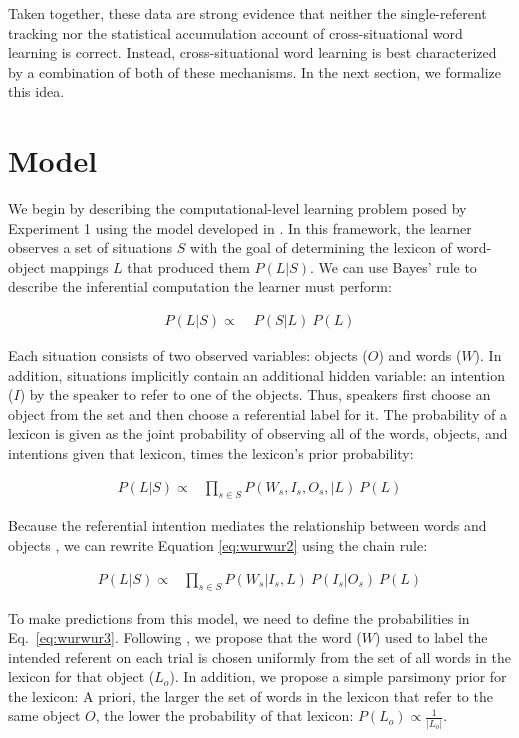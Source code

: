 \documentclass[man,floatsintext]{apa6}
\begin{document}
Taken together, these data are strong evidence that neither the single-referent tracking nor the statistical accumulation account of cross-situational word learning is correct. Instead, cross-situational word learning is best characterized by a combination of both of these mechanisms. In the next section, we formalize this idea.

\section{Model}

We begin by describing the computational-level learning problem posed by Experiment 1 using the model developed in \cite{Frank2009a}. In this framework, the learner observes a set of situations $S$ with the goal of determining the lexicon of word-object mappings $L$ that produced them $P(L|S)$. We can use Bayes' rule to describe the inferential computation the learner must perform: 

\begin{align} 
P(L|S) \propto & \;P(S|L) \: P(L) \label{eq:wurwur1}
\end{align}

\noindent Each situation consists of two observed variables: objects ($O$) and words ($W$). In addition, situations implicitly contain an additional hidden variable: an intention ($I$) by the speaker to refer to one of the objects. Thus, speakers first choose an object from the set and then choose a referential label for it. The probability of a lexicon is given as the joint probability of observing all of the words, objects, and intentions given that lexicon, times the lexicon's prior probability:

\begin{align}
P(L|S) \propto & \prod\limits_{s\in{S}}P(W_{s},I_{s}, O_{s},|L) \: P(L) \label{eq:wurwur2}
\end{align}

\noindent Because the referential intention mediates the relationship between words and objects \cite{Frank2009a}, we can rewrite Equation \ref{eq:wurwur2} using the chain rule:

\begin{align}
P(L|S) \propto & \prod\limits_{s\in{S}}P(W_{s}| I_{s}, L) \: P(I_{s}|O_{s})  \: P(L) \label{eq:wurwur3}
\end{align}

To make predictions from this model, we need to define the probabilities in Eq.~\ref{eq:wurwur3}. Following \cite{Frank2009a}, we propose that the word ($W$) used to label the intended referent on each trial is chosen uniformly from the set of all words in the lexicon for that object ($L_{o}$). In addition, we propose a simple parsimony prior for the lexicon: A priori, the larger the set of words in the lexicon that refer to the same object $O$, the lower the probability of that lexicon: $P(L_{o}) \propto \frac{1}{|L_{o}|}$. 
\end{document}
